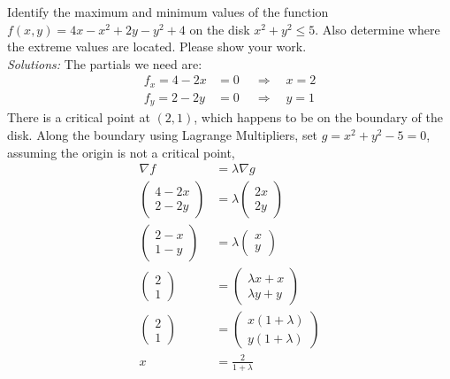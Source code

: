     \question[6] Identify the maximum and minimum values of the function $f(x,y) = 4x - x^2 + 2y - y^2  + 4$ on the disk $x^2+y^2 \le 5$. Also determine where the extreme values are located. Please show your work. 
    \ifnum {} {\color{DarkBlue} \\ \textit{Solutions:} The partials we need are: 
    \begin{align*}
        f_x = 4 - 2x &=0 \ \quad \Rightarrow \quad x= 2 \\
        f_y = 2 - 2y &=0 \ \quad \Rightarrow \quad y= 1 
    \end{align*}
    There is a critical point at $(2,1)$, which happens to be on the boundary of the disk. Along the boundary using Lagrange Multipliers, set $g = x^2 + y^2 - 5 = 0$, assuming the origin is not a critical point,
    \begin{align*}
        \nabla f &= \lambda \nabla g \\
        \begin{pmatrix} 4 - 2x \\ 2 - 2y \end{pmatrix} &= \lambda \begin{pmatrix} 2x\\2y \end{pmatrix} \\ 
        \begin{pmatrix} 2 - x \\ 1 - y \end{pmatrix} &= \lambda \begin{pmatrix} x\\y \end{pmatrix} \\ 
        \begin{pmatrix} 2 \\ 1 \end{pmatrix} &= \begin{pmatrix} \lambda x + x\\ \lambda y + y \end{pmatrix} \\ 
        \begin{pmatrix} 2 \\ 1 \end{pmatrix} &= \begin{pmatrix} x(1 + \lambda )\\  y( 1 + \lambda) \end{pmatrix} \\ 
        x&=\frac{2}{1+\lambda} \\

\end{align*}}
